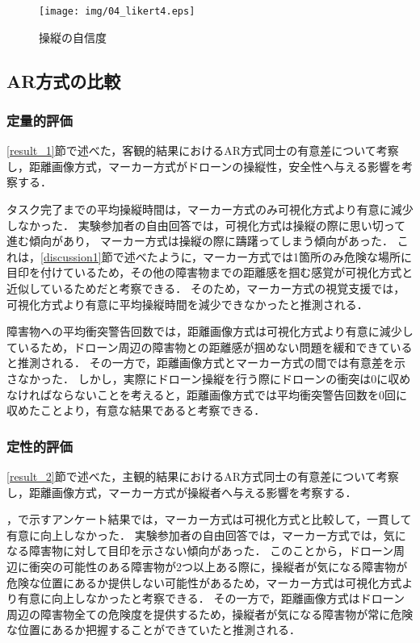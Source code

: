 \documentclass[submit, sigrecommended]{ipsj}
\begin{document}

\begin{figure}[tb]
  \centering
  \texttt{[image: img/04\_likert4.eps]}
  \caption{操縦の自信度}
  \label{fig:04_likert4}
  \end{figure}
  

\subsection{AR方式の比較}
\subsubsection{定量的評価}
\ref{result_1}節で述べた，客観的結果におけるAR方式同士の有意差について考察し，距離画像方式，マーカー方式がドローンの操縦性，安全性へ与える影響を考察する．
\par
タスク完了までの平均操縦時間は，マーカー方式のみ可視化方式より有意に減少しなかった．
実験参加者の自由回答では，可視化方式は操縦の際に思い切って進む傾向があり，
マーカー方式は操縦の際に躊躇ってしまう傾向があった．
これは，\ref{discussion1}節で述べたように，マーカー方式では1箇所のみ危険な場所に目印を付けているため，その他の障害物までの距離感を掴む感覚が可視化方式と近似しているためだと考察できる．
そのため，マーカー方式の視覚支援では，可視化方式より有意に平均操縦時間を減少できなかったと推測される．
\par
障害物への平均衝突警告回数では，距離画像方式は可視化方式より有意に減少しているため，ドローン周辺の障害物との距離感が掴めない問題を緩和できていると推測される．
その一方で，距離画像方式とマーカー方式の間では有意差を示さなかった．
しかし，実際にドローン操縦を行う際にドローンの衝突は0に収めなければならないことを考えると，距離画像方式では平均衝突警告回数を0回に収めたことより，有意な結果であると考察できる．

\subsubsection{定性的評価}
\ref{result_2}節で述べた，主観的結果におけるAR方式同士の有意差について考察し，距離画像方式，マーカー方式が操縦者へ与える影響を考察する．
\par
{}，で示すアンケート結果では，マーカー方式は可視化方式と比較して，一貫して有意に向上しなかった．
実験参加者の自由回答では，マーカー方式では，気になる障害物に対して目印を示さない傾向があった．
このことから，ドローン周辺に衝突の可能性のある障害物が2つ以上ある際に，操縦者が気になる障害物が危険な位置にあるか提供しない可能性があるため，マーカー方式は可視化方式より有意に向上しなかったと考察できる．
その一方で，距離画像方式はドローン周辺の障害物全ての危険度を提供するため，操縦者が気になる障害物が常に危険な位置にあるか把握することができていたと推測される．
\end{document}
